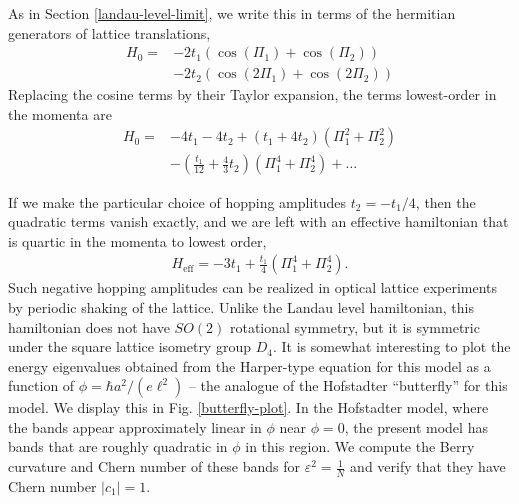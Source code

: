 \documentclass[aps,prb,twocolumn,letterpaper,twoside,nobalancelastpage,groupedaddress,amsmath,amssymb,floatfix,citeautoscript]{revtex4-1}
\begin{document}
As in Section \ref{landau-level-limit}, we write this in terms of the hermitian generators of lattice translations,
\begin{align*}
H_0 = &-2t_1\left(\cos(\Pi_1) + \cos(\Pi_2)\right)\\ &- 2t_2\left(\cos(2\Pi_1) + \cos(2\Pi_2)\right)
\end{align*}
Replacing the cosine terms by their Taylor expansion, the terms lowest-order in the momenta are 
\begin{align*}{}
H_0 = &-4 t_1 - 4 t_2 + (t_1 + 4t_2) \left(\Pi_1^2 + \Pi_2^2\right) \\
&- \left(\frac{t_1}{12} + \frac{4}{3}t_2\right) \left(\Pi_1^4 + \Pi_2^4\right) + \ldots
\end{align*}

If we make the particular choice of hopping amplitudes $t_2 = -t_1/4$, then the quadratic terms vanish exactly, and we are left with an effective hamiltonian that is quartic in the momenta to lowest order,
\begin{align}
\label{hamiltonian-quartic-effective}
H_{\text{eff}} = -3t_1 + \frac{t_1}{4} \left(\Pi_1^4 + \Pi_2^4\right).
\end{align}
Such negative hopping amplitudes can be realized in optical lattice experiments by periodic shaking of the lattice\cite{eckardt_colloquium_2017}. Unlike the Landau level hamiltonian, this hamiltonian does not have $SO(2)$ rotational symmetry, but it is symmetric under the square lattice isometry group $D_4$. It is somewhat interesting to plot the energy eigenvalues obtained from the Harper-type equation for this model as a function of $\phi = \hbar a^2/(e \ell^2)$ -- the analogue of the Hofstadter ``butterfly'' for this model\cite{hofstadter_energy_1976}. We display this in Fig. \ref{butterfly-plot}. In the Hofstadter model, where the bands appear approximately linear in $\phi$ near $\phi = 0$, the present model has bands that are roughly quadratic in $\phi$ in this region. We compute the Berry curvature and Chern number of these bands for $\varepsilon^2 = \frac{1}{N}$ and verify that they have Chern number $|c_1| = 1$.
\end{document}
